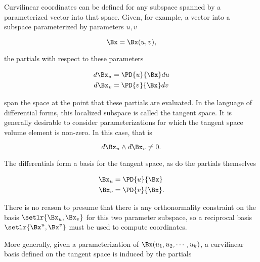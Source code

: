 %
%
Curvilinear coordinates can be defined for any subspace spanned by a parameterized vector into that space.  Given, for example, a vector into a subspace parameterized by parameters \(u,v\)

\begin{equation}\label{eqn:curvilinear:20}
\Bx = \Bx(u, v),
\end{equation}

the partials with respect to these parameters

\begin{equation}\label{eqn:curvilinear:40}
\begin{aligned}
d\Bx_u &= \PD{u}{\Bx} du \\
d\Bx_v &= \PD{v}{\Bx} dv
\end{aligned}
\end{equation}

span the space at the point that these partials are evaluated.  In the language of differential forms, this localized subspace is called the tangent space.  It is generally desirable to consider parameterizations for which the tangent space volume element is non-zero.  In this case, that is

\begin{equation}\label{eqn:curvilinear:60}
d\Bx_u \wedge d\Bx_v \ne 0.
\end{equation}

The differentials form a basis for the tangent space, as do the partials themselves

\begin{equation}\label{eqn:curvilinear:80}
\begin{aligned}
\Bx_u &= \PD{u}{\Bx} \\
\Bx_v &= \PD{v}{\Bx}.
\end{aligned}
\end{equation}

There is no reason to presume that there is any orthonormality constraint on the basis \( \setlr{ \Bx_u, \Bx_v } \) for this two parameter subspace, so a reciprocal basis \( \setlr{ \Bx^u, \Bx^v } \)
must be used to compute coordinates.

More generally, given a parameterization of \( \Bx(u_1, u_2, \cdots, u_k) \), a curvilinear basis defined on the tangent space is induced by the partials

